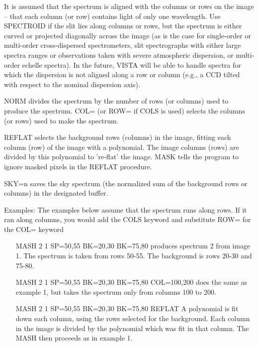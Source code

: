 It is assumed that the spectrum is aligned with the columns or rows on the
image -- that each column (or row) contains light of only one wavelength.
Use SPECTROID if the slit lies along columns or rows, but the spectrum is
either curved or projected diagonally across the image (as is the case for
single-order or multi-order cross-dispersed spectrometers, slit
spectrographs with either large spectra ranges or observations taken with
severe atmospheric dispersion, or multi-order echelle spectra).  In the
future, VISTA will be able to handle spectra for which the dispersion is
not aligned along a row or column (e.g., a CCD tilted with respect to the
nominal dispersion axis).

NORM divides the spectrum by the number of rows (or columns) used to
produce the spectrum.  COL= (or ROW= if COLS is used) selects the columns
(or rows) used to make the spectrum.

REFLAT selects the background rows (columns) in the image, fitting each
column (row) of the image with a polynomial.  The image columns (rows) are
divided by this polynomial to 're-flat' the image.  MASK tells the program
to ignore masked pixels in the REFLAT procedure.

SKY=n saves the sky spectrum (the normalized sum of the background rows or
columns) in the designated buffer.

Examples: The examples below assume that the spectrum runs along rows.  If
it ran along columns, you would add the COLS keyword and substitute ROW=
for the COL= keyword
\begin{itemize}
  \item[MASH 2 1 SP=50,55 BK=20,30 BK=75,80\hfill]{ produces spectrum 2
       from image 1.  The spectrum is taken from rows 50-55.  The
       background is rows 20-30 and 75-80.}

  \item[MASH 2 1 SP=50,55 BK=20,30 BK=75,80 COL=100,200\hfill]{ does the
       same as example 1, but takes the spectrum only from columns 100 to
       200.}

  \item[MASH 2 1 SP=50,55 BK=20,30 BK=75,80 REFLAT\hfill]{ A polynomial is
       fit down each column, using the rows selected for the background.
       Each column in the image is divided by the polynomial which was fit
       in that column.  The MASH then proceeds as in example 1.}
\end{itemize}

